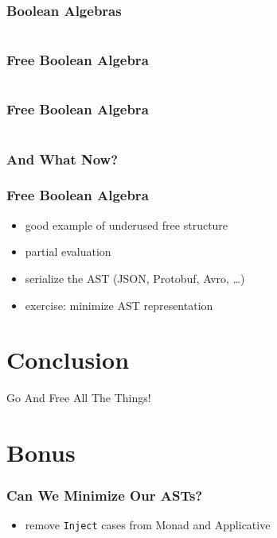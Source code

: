 \documentclass{beamer}
\begin{document}
\begin{frame}
  \frametitle{Boolean Algebras}
  \inputminted{scala}{snippets/boolean-algebra.scala}
\end{frame}

\begin{frame}
  \frametitle{Free Boolean Algebra}
  \inputminted{scala}{snippets/free-bool.scala}
\end{frame}

\begin{frame}
  \frametitle{Free Boolean Algebra}
  \inputminted{scala}{snippets/free-bool-interp.scala}
\end{frame}

\begin{frame}
  \frametitle{And What Now?}
\end{frame}

\begin{frame}
  \frametitle{Free Boolean Algebra}
  \begin{itemize}
  \item good example of underused free structure
  \item partial evaluation
  \item serialize the AST (JSON, Protobuf, Avro, \ldots{})
  \item exercise: minimize AST representation
  \end{itemize}
\end{frame}

\section{Conclusion}\label{sec:conclusion}

\begin{frame}
  \begin{center}
    \Huge
    Go And Free All The Things!
  \end{center}
\end{frame}

\begin{frame}
  \tableofcontents{}
\end{frame}

\section{Bonus}\label{sec:bonus}

\begin{frame}
  \frametitle{Can We Minimize Our ASTs?}
  \begin{itemize}
  \item remove \texttt{Inject} cases from Monad and Applicative
  \end{itemize}
\end{frame}
\end{document}
